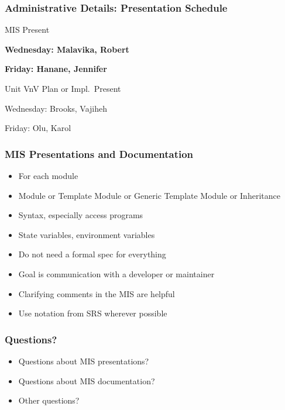 \documentclass[t,12pt,numbers,fleqn]{beamer}
\begin{document}

\begin{frame}
\frametitle{Administrative Details: Presentation Schedule}

\bi
\item MIS Present
\bi
\item \textbf{Wednesday: Malavika, Robert}
\item \textbf{Friday: Hanane,  Jennifer}
\ei
\item Unit VnV Plan or Impl.\ Present
\bi
\item Wednesday: Brooks, Vajiheh
\item Friday: Olu, Karol
\ei
\ei

\end{frame}


\begin{frame}
\frametitle{MIS Presentations and Documentation}
\begin{itemize}
\item For each module
\bi
\item Module or Template Module or Generic Template Module or Inheritance
\item Syntax, especially access programs
\item State variables, environment variables
\ei
\item Do not need a formal spec for everything
\item Goal is communication with a developer or maintainer
\item Clarifying comments in the MIS are helpful
\item Use notation from SRS wherever possible
\end{itemize}
\end{frame}


\begin{frame}
\frametitle{Questions?}
\begin{itemize}
\item Questions about MIS presentations?
\item Questions about MIS documentation?
\item Other questions?
\end{itemize}
\end{frame}

\end{document}
